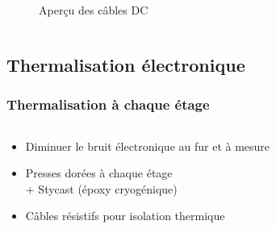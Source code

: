 \documentclass[10pt,a9paper,handout]{beamer} \usepackage[utf8]{inputenc} \usepackage[francais]{babel} \usepackage[T1]{fontenc}
\begin{document}
\begin{frame}
\begin{columns}
\begin{column}{0.3\textwidth}
\begin{figure}[h]
\begin{center}
        \caption{Aperçu des câbles DC}
    \end{center}
\end{figure}
\end{column}
\end{columns}

\end{frame}
\subsection{Thermalisation électronique}
\begin{frame}
\frametitle{Thermalisation à chaque étage}

\begin{columns}
\begin{column}{0.6\textwidth}
    \begin{itemize}
        \item Diminuer le bruit électronique au fur et à mesure
        \vspace*{5mm}
        \item Presses dorées à chaque étage \\
        + Stycast (époxy cryogénique)
        \vspace*{5mm}
        \item Câbles résistifs pour isolation thermique
    \end{itemize}
\end{column}
\begin{column}{0.3\textwidth}
\begin{figure}
    \begin{center}

\end{center}
\end{figure}
\end{column}
\end{columns}
\end{frame}
\end{document}
